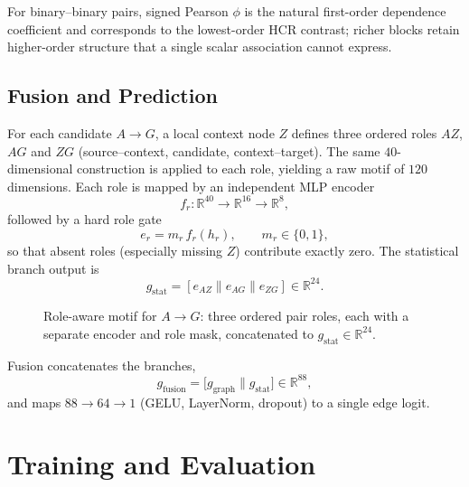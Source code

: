 For binary--binary pairs, signed Pearson $\phi$ is the natural first-order dependence coefficient and corresponds to the lowest-order HCR contrast; richer blocks retain higher-order structure that a single scalar association cannot express.

\subsection{Fusion and Prediction}
\label{sec:taskA-fusion}

For each candidate $A\to G$, a local context node $Z$ defines three ordered roles $AZ$, $AG$ and $ZG$ (source--context, candidate, context--target).
The same $40$-dimensional construction is applied to each role, yielding a raw motif of $120$ dimensions.
Each role is mapped by an independent MLP encoder
\begin{equation}
\label{eq:taskA-fr}
f_{r}:\mathbb{R}^{40}\to\mathbb{R}^{16}\to\mathbb{R}^{8},
\end{equation}
followed by a hard role gate
\begin{equation}
\label{eq:taskA-role-gate}
e_{r}=m_{r}\,f_{r}(h_{r}),\qquad m_{r}\in\{0,1\},
\end{equation}
so that absent roles (especially missing $Z$) contribute exactly zero.
The statistical branch output is
\begin{equation}
\label{eq:taskA-gstat}
g_{\mathrm{stat}}=[e_{AZ}\parallel e_{AG}\parallel e_{ZG}]\in\mathbb{R}^{24}.
\end{equation}

\begin{figure}[!ht]
\centering
\resizebox{0.62\textwidth}{!}{}
\caption{Role-aware motif for $A\to G$: three ordered pair roles, each with a separate encoder and role mask, concatenated to $g_{\mathrm{stat}}\in\mathbb{R}^{24}$.}
\label{fig:taskA-motif}
\end{figure}

Fusion concatenates the branches,
\begin{equation}
g_{\mathrm{fusion}}=\bigl[g_{\mathrm{graph}}\parallel g_{\mathrm{stat}}\bigr]\in\mathbb{R}^{88},
\end{equation}
and maps $88\to 64\to 1$ (GELU, LayerNorm, dropout) to a single edge logit.

\section{Training and Evaluation}
\label{sec:taskA-train-eval}


